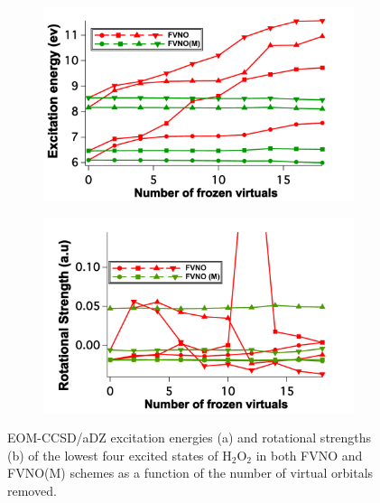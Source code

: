 \begin{figure}
\begin{subfigure}{.5\textwidth}
  \centering
  \includegraphics[width=.9\linewidth]{figures_fvno++/fvno(m)_h2o2_adz_ee.pdf}
  \caption{}
  \label{fig:sfig1}
\end{subfigure}%
\begin{subfigure}{.5\textwidth}
  \centering
  \includegraphics[width=.9\linewidth]{figures_fvno++/fvno(m)_h2o2_adz_rs.pdf}
  \caption{}
  \label{fig:sfig2}
\end{subfigure}
\caption{{\footnotesize EOM-CCSD/aDZ excitation energies (a) and rotational strengths (b) of the lowest four excited states of H$_2$O$_2$ in both FVNO and FVNO(M) schemes as a function of the number of virtual orbitals removed.}}
\label{fig:fvno(m)_h2o2_adz_ee_rs}
\end{figure}
